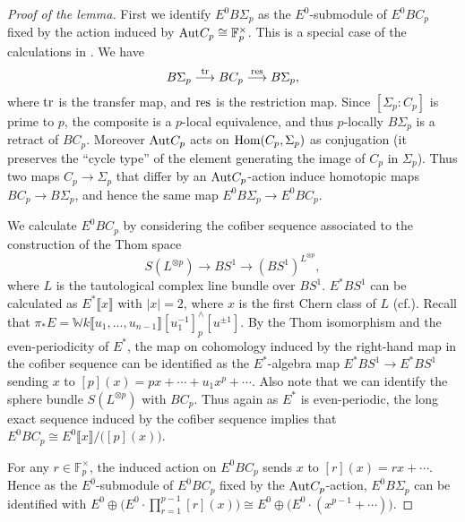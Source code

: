 \documentclass{gtpart}
\theoremstyle{definition}
\theoremstyle{remark}
\newcommand{\mb}[1]{\mathbb{#1}}
\newcommand{\Hom}{\ensuremath{{\rm Hom}}}
\newcommand{\cff}[2]{cf.\thinspace{\cite[#1]{#2}}}
\begin{document}
\begin{proof}[Proof of the lemma]
 First we identify $E^0 B\Sigma_p$ as the $E^0$-submodule of $E^0 BC_p$ fixed 
 by the action induced by ${\rm Aut} C_p \cong {\mb F}_p^\times$. This is a 
 special case of the calculations in \cite[section 12]{lpo}.  We have 
 \[
  B\Sigma_p \stackrel{\rm tr}{\longrightarrow} BC_p 
  \stackrel{\rm res}{\longrightarrow} B\Sigma_p, 
 \]
 where $\rm tr$ is the transfer map, and $\rm res$ is the restriction map.  
 Since $[\Sigma_p : C_p]$ is prime to $p$, the composite is a $p$-local 
 equivalence, and thus $p$-locally $B\Sigma_p$ is a retract of $BC_p$.  
 Moreover ${\rm Aut} C_p$ acts on $\Hom (C_p,\Sigma_p)$ as conjugation (it 
 preserves the ``cycle type'' of the element generating the image of $C_p$ in 
 $\Sigma_p$).  Thus two maps $C_p \to \Sigma_p$ that differ by an 
 ${\rm Aut} C_p$-action induce homotopic maps $BC_p \to B\Sigma_p$, and hence 
 the same map $E^0 B\Sigma_p \to E^0 BC_p$.  

 We calculate $E^0 BC_p$ by considering the cofiber sequence associated to the 
 construction of the Thom space 
 \[
  S(L^{\otimes p}) \to BS^1 \to (BS^1)^{L^{\otimes p}}, 
 \]
 where $L$ is the tautological complex line bundle over $BS^1$.  $E^* BS^1$ 
 can be calculated as $E^* \llbracket x \rrbracket$ with $|x| = 2$, where $x$ 
 is the first Chern class of $L$ (\cff{section 1}{coctalos}).  Recall that 
 $\pi_* E = {\mb W}k \llbracket u_1,...,u_{n-1} \rrbracket 
 [u_1^{-1}]_p^\wedge [u^{\pm1}]$.  By the Thom isomorphism and the 
 even-periodicity of $E^*$, the map on cohomology induced by the right-hand 
 map in the cofiber sequence can be identified as the $E^*$-algebra map 
 $E^* BS^1 \to E^* BS^1$ sending $x$ to $[p](x) = p x + \cdots + u_1 x^p + 
 \cdots$.  Also note that we can identify the sphere bundle $S(L^{\otimes p})$ 
 with $BC_p$.  Thus again as $E^*$ is even-periodic, the long exact sequence 
 induced by the cofiber sequence implies that $E^0 BC_p \cong 
 E^0 \llbracket x \rrbracket / \big([p](x)\big)$.  

 For any $r \in {\mb F}_p^\times$, the induced action on $E^0 BC_p$ sends $x$ 
 to $[r](x) = r x + \cdots$.  Hence as the $E^0$-submodule of $E^0 BC_p$ fixed 
 by the ${\rm Aut} C_p$-action, $E^0 B\Sigma_p$ can be identified with 
 $E^0 \oplus \big(E^0 \cdot \prod_{r=1}^{p-1} [r](x)\big) \cong 
 E^0 \oplus \big(E^0 \cdot (x^{p-1} + \cdots)\big)$.  


\end{proof}
\end{document}

